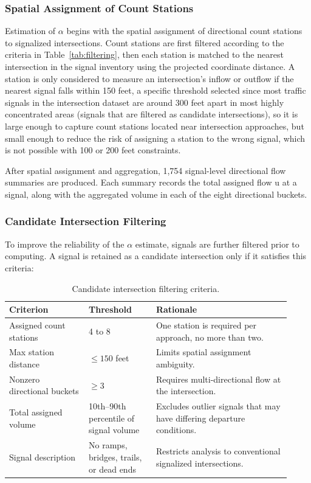 \documentclass[12pt]{article}
\begin{document}
\subsubsection{Spatial Assignment of Count Stations}

Estimation of $\alpha$ begins with the spatial assignment of directional count stations to signalized intersections. Count stations are first filtered according to the criteria in Table~\ref{tab:filtering}, then each station is matched to the nearest intersection in the signal inventory using the projected coordinate distance. A station is only considered to measure an intersection's inflow or outflow if the nearest signal falls within 150 feet, a specific threshold selected since most traffic signals in the intersection dataset are around 300 feet apart in most highly concentrated areas (signals that are filtered as candidate intersections), so it is large enough to capture count stations located near intersection approaches, but small enough to reduce the risk of assigning a station to the wrong signal, which is not possible with 100 or 200 feet constraints.

After spatial assignment and aggregation, 1,754 signal-level directional flow summaries are produced. Each summary records the total assigned flow u at a signal, along with the aggregated volume in each of the eight directional buckets.

\subsubsection{Candidate Intersection Filtering}

To improve the reliability of the $\alpha$ estimate, signals are further filtered prior to computing. A signal is retained as a candidate intersection only if it satisfies this criteria:

\begin{table}[H]
\centering
\begin{tabular}{@{} p{0.26\linewidth} p{0.22\linewidth} p{0.44\linewidth} @{}}
\toprule
\textbf{Criterion} & \textbf{Threshold} & \textbf{Rationale} \\
\midrule
Assigned count stations & 4 to 8 &
One station is required per approach, no more than two. \\

Max station distance & $\leq 150$ feet &
Limits spatial assignment ambiguity. \\

Nonzero directional buckets & $\geq 3$ &
Requires multi-directional flow at the intersection. \\

Total assigned volume & 10th--90th percentile of signal volume &
Excludes outlier signals that may have differing departure conditions. \\

Signal description & No ramps, bridges, trails, or dead ends &
Restricts analysis to conventional signalized intersections. \\
\bottomrule
\end{tabular}
\caption{Candidate intersection filtering criteria.}
\label{tab:candidate-filtering}
\end{table}
\end{document}
